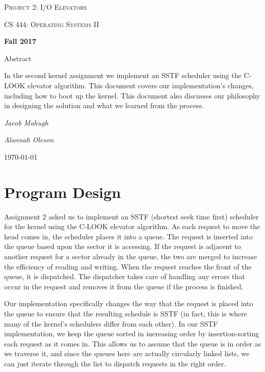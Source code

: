 \documentclass[letterpaper,10pt,titlepage]{article}
\begin{document}
\begin{titlepage}
	\centering
	\vspace*{4cm}
	{\scshape\huge Project 2: I/O Elevators\par}
	\vspace{1cm}
	{\scshape\LARGE CS 444: Operating Systems II\par}
	\vspace{0.5cm}
	{\large\bfseries Fall 2017\par}
	{\large Abstract\par}
	\vspace {0.5cm}
	In the second kernel assignment we implement an SSTF scheduler using the
	C-LOOK elevator algorithm. This document covers our implementation's changes,
	including how to boot up the kernel. This document also discusses our philosophy
	in designing the solution and what we learned from the process.
	\par
	\vspace{1cm}
	{\Large\itshape Jacob Mahugh\par}
    \vspace {0.5cm}
    {\Large\itshape Alannah Oleson\par}
	\vfill
	{\large \today\par}	
\end{titlepage}



\section{Program Design}
Assignment 2 asked us to implement an SSTF (shortest seek time first) scheduler for the kernel using the C-LOOK elevator algorithm. 
As each request to move the head comes in, the scheduler places it into a queue. 
The request is inserted into the queue based upon the sector it is accessing.
If the request is adjacent to another request for a sector already in the queue, the two are merged to increase the efficiency of reading and writing.
When the request reaches the front of the queue, it is dispatched.
The dispatcher takes care of handling any errors that occur in the request and removes it from the queue if the process is finished.

Our implementation specifically changes the way that the request is placed into the queue to ensure that the resulting schedule is SSTF
(in fact, this is where many of the kernel's schedulers differ from each other).
In our SSTF implementation, we keep the queue sorted in increasing order by insertion-sorting each request as it comes in.
This allows us to assume that the queue is in order as we traverse it, and since the queues here are actually circularly linked lists, we can just iterate through the list to dispatch requests in the right order.
\end{document}
